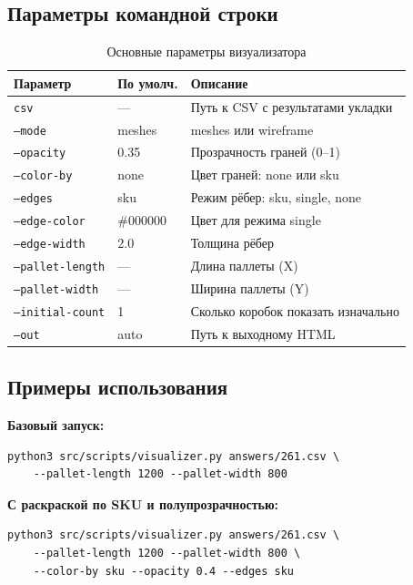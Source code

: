 \subsection{Параметры командной строки}

\begin{table}[ht]
\centering
\caption{Основные параметры визуализатора}
\label{tab:visualizer_params}
\begin{tabular}{|l|l|p{6cm}|}
\hline
\textbf{Параметр} & \textbf{По умолч.} & \textbf{Описание} \\
\hline
\texttt{csv} & --- & Путь к CSV с результатами укладки \\
\texttt{--mode} & meshes & meshes или wireframe \\
\texttt{--opacity} & 0.35 & Прозрачность граней (0--1) \\
\texttt{--color-by} & none & Цвет граней: none или sku \\
\texttt{--edges} & sku & Режим рёбер: sku, single, none \\
\texttt{--edge-color} & \#000000 & Цвет для режима single \\
\texttt{--edge-width} & 2.0 & Толщина рёбер \\
\texttt{--pallet-length} & --- & Длина паллеты (X) \\
\texttt{--pallet-width} & --- & Ширина паллеты (Y) \\
\texttt{--initial-count} & 1 & Сколько коробок показать изначально \\
\texttt{--out} & auto & Путь к выходному HTML \\
\hline
\end{tabular}
\end{table}

\subsection{Примеры использования}

\textbf{Базовый запуск:}
\begin{verbatim}
python3 src/scripts/visualizer.py answers/261.csv \
    --pallet-length 1200 --pallet-width 800
\end{verbatim}

\textbf{С раскраской по SKU и полупрозрачностью:}
\begin{verbatim}
python3 src/scripts/visualizer.py answers/261.csv \
    --pallet-length 1200 --pallet-width 800 \
    --color-by sku --opacity 0.4 --edges sku
\end{verbatim}

